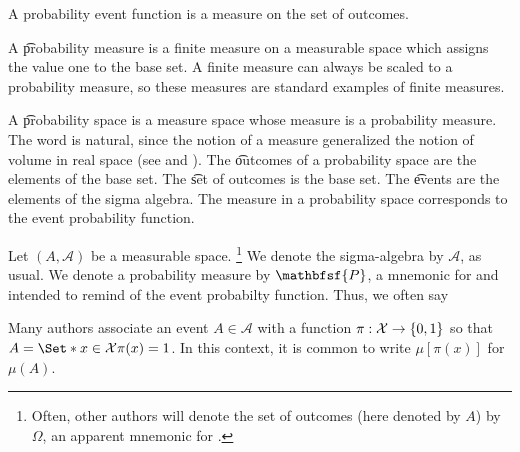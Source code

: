 

A probability event function is a measure on the set of outcomes.


A \t{probability measure} is a finite measure on a measurable space which assigns the value one to the base set.
A finite measure can always be scaled to a probability measure, so these measures are standard examples of finite measures.

A \t{probability space} is a measure space whose measure is a probability measure.
The word  is natural, since the notion of a measure generalized the notion of volume in real space (see  and ).
The \t{outcomes} of a probability space are the elements of the base set.
The \t{set of outcomes} is the base set.
The \t{events} are the elements of the sigma algebra.
The measure in a probability space corresponds to the event probability function.


Let $(A, \mathcal{A} )$ be a measurable space.
  \ifhmode\unskip\fi\footnote{
Often, other authors will denote the set of outcomes (here denoted by $A$) by $\Omega $, an apparent mnemonic for .
  }
We denote the sigma-algebra by $\mathcal{A} $, as usual.
We denote a probability measure by $\mathbfsf{P} $, a mnemonic for  and intended to remind of the event probabilty function.
Thus, we often say 

Many authors associate an event $A \in \mathcal{A} $ with a function $\pi : \mathcal{X}  \to \{0, 1\}$ so that $A = \Set*{x \in \mathcal{X} }{\pi (x) = 1}$.
In this context, it is common to write $\mu [\pi (x)]$ for $\mu (A)$.
